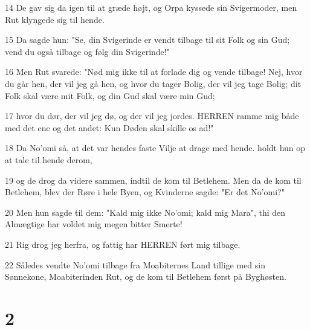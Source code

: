 \par 14 De gav sig da igen til at græde højt, og Orpa kyssede sin Svigermoder, men Rut klyngede sig til hende.
\par 15 Da sagde hun: "Se, din Svigerinde er vendt tilbage til sit Folk og sin Gud; vend du også tilbage og følg din Svigerinde!"
\par 16 Men Rut svarede: "Nød mig ikke til at forlade dig og vende tilbage! Nej, hvor du går hen, der vil jeg gå hen, og hvor du tager Bolig, der vil jeg tage Bolig; dit Folk skal være mit Folk, og din Gud skal være min Gud;
\par 17 hvor du dør, der vil jeg dø, og der vil jeg jordes. HERREN ramme mig både med det ene og det andet: Kun Døden skal skille os ad!"
\par 18 Da No'omi så, at det var hendes faste Vilje at drage med hende. holdt hun op at tale til hende derom,
\par 19 og de drog da videre sammen, indtil de kom til Betlehem. Men da de kom til Betlehem, blev der Røre i hele Byen, og Kvinderne sagde: "Er det No'omi?"
\par 20 Men hun sagde til dem: "Kald mig ikke No'omi; kald mig Mara", thi den Almægtige har voldet mig megen bitter Smerte!
\par 21 Rig drog jeg herfra, og fattig har HERREN ført mig tilbage.
\par 22 Således vendte No'omi tilbage fra Moabiternes Land tillige med sin Sønnekone, Moabiterinden Rut, og de kom til Betlehem først på Byghøsten.

\chapter{2}

